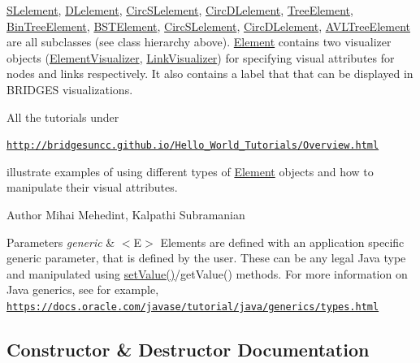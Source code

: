 \hyperlink{classbridges_1_1base_1_1_s_lelement}{S\+Lelement}, \hyperlink{classbridges_1_1base_1_1_d_lelement}{D\+Lelement}, \hyperlink{classbridges_1_1base_1_1_circ_s_lelement}{Circ\+S\+Lelement}, \hyperlink{classbridges_1_1base_1_1_circ_d_lelement}{Circ\+D\+Lelement}, \hyperlink{classbridges_1_1base_1_1_tree_element}{Tree\+Element}, \hyperlink{classbridges_1_1base_1_1_bin_tree_element}{Bin\+Tree\+Element}, \hyperlink{classbridges_1_1base_1_1_b_s_t_element}{B\+S\+T\+Element}, \hyperlink{classbridges_1_1base_1_1_circ_s_lelement}{Circ\+S\+Lelement}, \hyperlink{classbridges_1_1base_1_1_circ_d_lelement}{Circ\+D\+Lelement}, \hyperlink{classbridges_1_1base_1_1_a_v_l_tree_element}{A\+V\+L\+Tree\+Element} are all subclasses (see class hierarchy above). \hyperlink{classbridges_1_1base_1_1_element}{Element} contains two visualizer objects (\hyperlink{classbridges_1_1base_1_1_element_visualizer}{Element\+Visualizer}, \hyperlink{classbridges_1_1base_1_1_link_visualizer}{Link\+Visualizer}) for specifying visual attributes for nodes and links respectively. It also contains a label that that can be displayed in B\+R\+I\+D\+G\+E\+S visualizations.

All the tutorials under

\href{http://bridgesuncc.github.io/Hello_World_Tutorials/Overview.html}{\tt http\+://bridgesuncc.\+github.\+io/\+Hello\+\_\+\+World\+\_\+\+Tutorials/\+Overview.\+html}

illustrate examples of using different types of \hyperlink{classbridges_1_1base_1_1_element}{Element} objects and how to manipulate their visual attributes.

\begin{DoxyAuthor}{Author}
Mihai Mehedint, Kalpathi Subramanian
\end{DoxyAuthor}

\begin{DoxyParams}{Parameters}
{\em generic} & $<$\+E$>$ Elements are defined with an application specific generic parameter, that is defined by the user. These can be any legal Java type and manipulated using \hyperlink{classbridges_1_1base_1_1_element_ab3cf1241da0bc4c59cea9d6f0fd7aaf4}{set\+Value()}/get\+Value() methods. For more information on Java generics, see for example, \href{https://docs.oracle.com/javase/tutorial/java/generics/types.html}{\tt https\+://docs.\+oracle.\+com/javase/tutorial/java/generics/types.\+html} \\
\hline
\end{DoxyParams}


\subsection{Constructor \& Destructor Documentation}
\hypertarget{classbridges_1_1base_1_1_element_aa5fc5728f2ed4b041118a77409442390}{}
